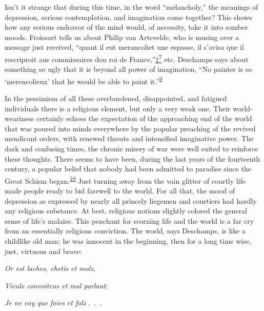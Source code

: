 Isn't it strange that during this time, in the word ``melancholy,'' the
meanings of depression, serious contemplation, and imagination come
together? This shows how any serious endeavor of the mind would, of
necessity, take it into somber moods. Froissart tells us about Philip
van Artevelde, who is musing over a message just received, ``quant il
eut merancoliet une espasse, il s'avisa que il rescriproit aus
commissaires dou roi de
France,''\protect\hypertarget{09_Chapter_Two__THE_CRAVING_FOR_A_M.xhtmlux5cux23id_2423}{\protect\hyperlink{23_NOTES.xhtmlux5cux23id_2424}{‡\textsuperscript{7}}}
etc. Deschamps says about something so ugly that it is beyond all power
of imagination, ``No painter is so `merencolieux' that he would be able
to paint
it.''\textsuperscript{\protect\hypertarget{09_Chapter_Two__THE_CRAVING_FOR_A_M.xhtmlux5cux23id_2068}{\protect\hyperlink{23_NOTES.xhtmlux5cux23id_2069}{9}}}

In the pessimism of all these overburdened, disappointed, and fatigued
individuals there is a religious element, but only a very weak one.
Their world-weariness certainly echoes the expectation of the
approaching end of the world that was poured into minds everywhere by
the popular preaching of the revived mendicant orders, with renewed
threats and intensified imaginative power. The dark and confusing times,
the chronic misery of war were well suited to reinforce these thoughts.
There seems to have been, during the last years of the fourteenth
century, a popular belief that nobody had been admitted to paradise
since the Great Schism
be\protect\hypertarget{09_Chapter_Two__THE_CRAVING_FOR_A_M.xhtmlux5cux23page_35}{}{}gan.\textsuperscript{\protect\hypertarget{09_Chapter_Two__THE_CRAVING_FOR_A_M.xhtmlux5cux23id_2066}{\protect\hyperlink{23_NOTES.xhtmlux5cux23id_2067}{10}}}
Just turning away from the vain glitter of courtly life made people
ready to bid farewell to the world. For all that, the mood of depression
as expressed by nearly all princely liegemen and courtiers had hardly
any religious substance. At best, religious notions slightly colored the
general sense of life's malaise. This penchant for scorning life and the
world is a far cry from an essentially religious conviction. The world,
says Deschamps, is like a childlike old man; he was innocent in the
beginning, then for a long time wise, just, virtuous and brave:

\emph{Or est laches, chetis et molz},

\emph{Vieulx convoiteus et mal parlant};

\emph{Je ne voy que foies et folz} .~.~.

